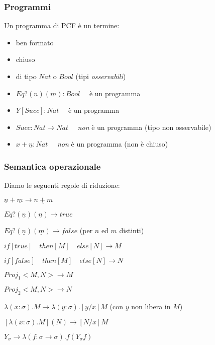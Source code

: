 \documentclass{beamer}
\begin{document}
\begin{frame}
	
	\frametitle{Programmi}
	
	Un programma di PCF è un termine:
	\begin{itemize}
		\item ben formato
		\item chiuso
		\item di tipo $Nat$ o $Bool$ (tipi \emph{osservabili})
	\end{itemize}

	
	\begin{example}
		\begin{itemize}
			\item $Eq?(\underline{n})(\underline{m}):Bool\quad$ è un programma
			\item $Y [Succ]:Nat\quad$ è un programma
			\item $Succ:Nat\rightarrow Nat\quad$ \emph{non} è un programma (tipo non osservabile)
			\item $x+\underline{n}:Nat\quad$ \emph{non} è un programma (non è chiuso)
		\end{itemize}

	\end{example}
	
\end{frame}


\begin{frame}
	
	\frametitle{Semantica operazionale}
	
	Diamo le seguenti regole di riduzione:
	\begin{description}
		\item[add] $\underline{n}+\underline{m} \rightarrow \underline{n+m}$
		\item[Eq?] $Eq?(\underline{n})(\underline{n})\rightarrow true$
		\item $Eq?(\underline{n})(\underline{m})\rightarrow false$ (per $n$ ed $m$ distinti)
		\item[cond] $if[true]\quad then[M]\quad else[N] \rightarrow M$
		\item $if[false]\quad then[M]\quad else[N] \rightarrow N$
		\item[proj] $Proj_1<M,N> \rightarrow M$
		\item $Proj_2<M,N> \rightarrow N$
		\item[$\alpha$] $\lambda (x:\sigma).M \rightarrow \lambda (y:\sigma).[y/x]M$ (con $y$ non libera in $M$)
		\item[$\beta$] $[\lambda(x:\sigma).M](N) \rightarrow [N/x]M$
		\item[$Y$] $Y_{\sigma} \rightarrow \lambda (f:\sigma \rightarrow \sigma).f(Y_{\sigma}f)$
	\end{description}
	
\end{frame}
\end{document}
